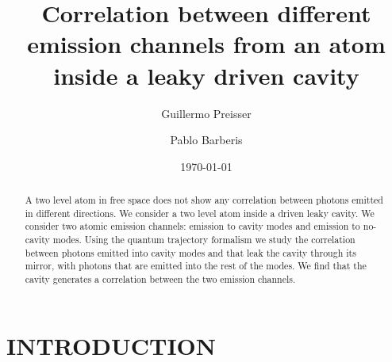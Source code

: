\documentclass[%
 reprint,
 amsmath,amssymb,
 aps, 
]{revtex4-2}
\begin{document}

\title{Correlation between different emission channels from an atom inside a leaky driven cavity}%

\author{Guillermo Preisser}
\author{Pablo Barberis}%



\date{\today}%

\begin{abstract}
A two level atom in free space does not show any correlation between
  photons emitted in different directions. We consider a two level
  atom inside a driven leaky cavity. We consider two atomic emission
  channels: emission to cavity modes and emission to no-cavity modes.
  Using the quantum trajectory formalism we study the correlation
  between photons emitted into cavity modes and that leak the cavity
  through its mirror, with photons that are emitted into the rest of
  the modes. We find that the cavity generates a correlation between
  the two emission channels.
\end{abstract}

\maketitle


\section{INTRODUCTION}
\end{document}
